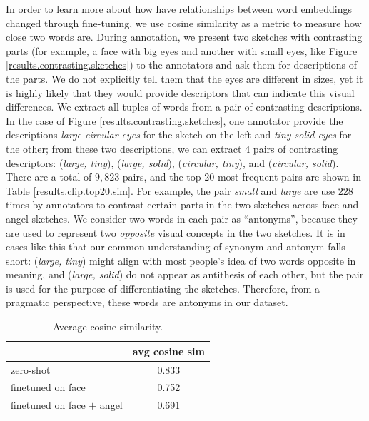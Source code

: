 In order to learn more about how have relationships between word embeddings changed through fine-tuning, we use cosine similarity as a metric to measure how close two words are. During annotation, we present two sketches with contrasting parts (for example, a face with big eyes and another with small eyes, like Figure \ref{results.contrasting.sketches}) to the annotators and ask them for descriptions of the parts. We do not explicitly tell them that the eyes are different in sizes, yet it is highly likely that they would provide descriptors that can indicate this visual differences.  
We extract all tuples of words from a pair of contrasting descriptions. In the case of Figure \ref{results.contrasting.sketches}, one annotator provide the descriptions \textit{large circular eyes} for the sketch on the left and \textit{tiny solid eyes} for the other; from these two descriptions, we can extract $4$ pairs of contrasting descriptors: (\textit{large, tiny}), (\textit{large, solid}), (\textit{circular, tiny}), and (\textit{circular, solid}). There are a total of $9,823$ pairs, and the top 20 most frequent pairs are shown in Table \ref{results.clip.top20.sim}. For example, the pair \textit{small} and \textit{large} are use $228$ times by annotators to contrast certain parts in the two sketches across face and angel sketches. 
We consider two words in each pair as ``antonyms'', because they are used to represent two \textit{opposite} visual concepts in the two sketches.   
It is in cases like this that our common understanding of synonym and antonym falls short: (\textit{large, tiny}) might align with most people's idea of two words opposite in meaning, and (\textit{large, solid}) do not appear as antithesis of each other, but the pair is used for the purpose of differentiating the sketches. Therefore, from a pragmatic perspective, these words are antonyms in our dataset. 

\begin{table}[htb!]
\begin{minipage}{1\textwidth}
\begin{center}
{\small
\begin{tabular}{l|c}
\toprule
~ & avg cosine sim \\
\midrule 
zero-shot & 0.833 \\
finetuned on face & 0.752 \\
finetuned on face $+$ angel & 0.691 \\
\bottomrule
\end{tabular}}
\caption{Average cosine similarity.}
\label{results.wordsim}
\end{center}
\end{minipage} 
\end{table}

